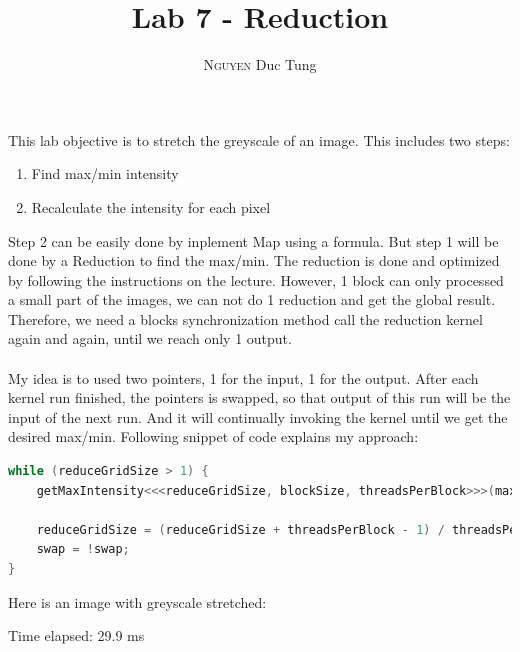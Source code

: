 \documentclass[12pt]{article}
\title{Lab 7 - Reduction}
\author{\textsc{Nguyen} Duc Tung}
\date{}
\begin{document}
\maketitle

This lab objective is to stretch the greyscale of an image. This includes two steps:

\begin{enumerate}
  \item Find max/min intensity
  \item Recalculate the intensity for each pixel
\end{enumerate}

Step 2 can be easily done by inplement Map using a formula. But step 1 will be done by a Reduction to find the max/min. The reduction is done and optimized by following the instructions on the lecture. However, 1 block can only processed a small part of the images, we can not do 1 reduction and get the global result. Therefore, we need a blocks synchronization method call the reduction kernel again and again, until we reach only 1 output.
\\\\
My idea is to used two pointers, 1 for the input, 1 for the output. After each kernel run finished, the pointers is swapped, so that output of this run will be the input of the next run. And it will continually invoking the kernel until we get the desired max/min. Following snippet of code explains my approach:
\\
\begin{lstlisting}[language=C]
while (reduceGridSize > 1) {
    getMaxIntensity<<<reduceGridSize, blockSize, threadsPerBlock>>>(maxArrayPointer[swap], maxArrayPointer[!swap]);

    reduceGridSize = (reduceGridSize + threadsPerBlock - 1) / threadsPerBlock;
    swap = !swap;
}
\end{lstlisting}

\pagebreak

Here is an image with greyscale stretched:

Time elapsed: 29.9 ms
\end{document}
